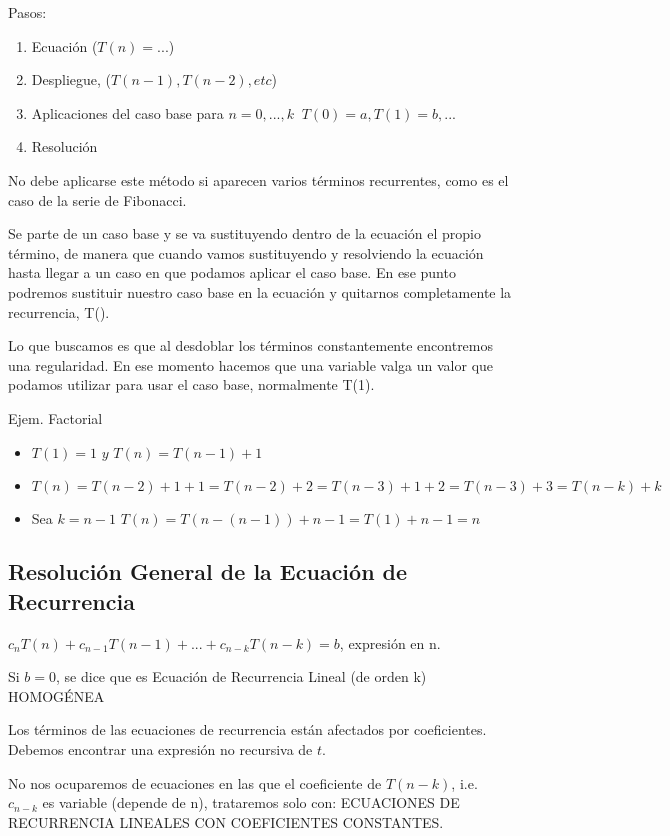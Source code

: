 Pasos:
\begin{enumerate}
  \item Ecuación ($T(n)=...$)
  \item Despliegue, ($T(n-1), T(n-2), etc$)
  \item Aplicaciones del caso base para $n=0, ..., k\;\; T(0)=a, T(1)=b, ...$
  \item Resolución
\end{enumerate}

No debe aplicarse este método si aparecen varios términos recurrentes, como es el caso de la serie de Fibonacci.

Se parte de un caso base y se va sustituyendo dentro de la ecuación el propio término, de manera que cuando vamos sustituyendo y resolviendo la ecuación hasta llegar a un caso en que podamos aplicar el caso base. En ese punto podremos sustituir nuestro caso base en la ecuación y quitarnos completamente la recurrencia, T().

Lo que buscamos es que al desdoblar los términos constantemente encontremos una regularidad. En ese momento hacemos que una variable valga un valor que podamos utilizar para usar el caso base, normalmente T(1).

Ejem. Factorial
\begin{itemize}
  \item $T(1) = 1 \textit{ y } T(n) = T(n-1)+1$
  \item $T(n) = T(n-2)+1+1=T(n-2)+2=T(n-3)+1+2=T(n-3)+3=T(n-k)+k$
  \item Sea $k=n-1$ $T(n)=T(n-(n-1))+n-1=T(1)+n-1=n$
\end{itemize}

\subsection{Resolución General de la Ecuación de Recurrencia}
$c_nT(n)+c_{n-1}T(n-1)+...+c_{n-k}T(n-k)=b$, expresión en n.

Si $b=0$, se dice que es Ecuación de Recurrencia Lineal (de orden k) HOMOGÉNEA

Los términos de las ecuaciones de recurrencia están afectados por coeficientes. Debemos encontrar una expresión no recursiva de $t$.

No nos ocuparemos de ecuaciones en las que el coeficiente de $T(n-k)$, i.e. $c_{n-k}$ es variable (depende de n), trataremos solo con: ECUACIONES DE RECURRENCIA LINEALES CON COEFICIENTES CONSTANTES.

